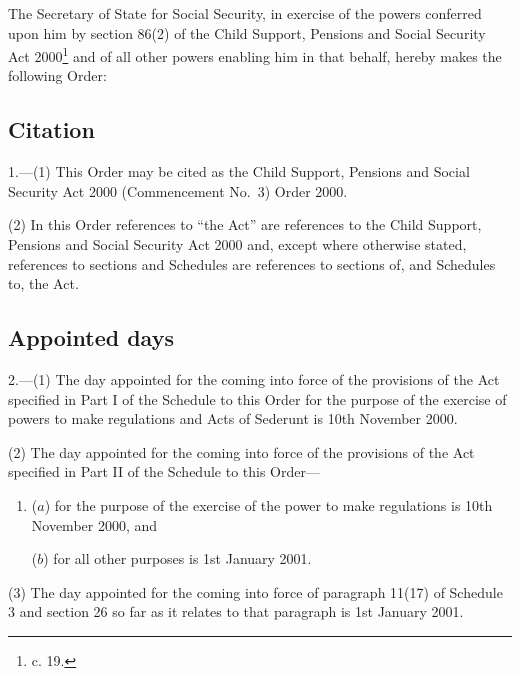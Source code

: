 \documentclass[12pt,a4paper]{article}
\title{\regstitle}
\author{S.I. 2000 No. 2994 (C.94)}
\date{Made 7th November 2000}
\begin{document}
\maketitle

\noindent
The Secretary of State for Social Security, in exercise of the powers conferred upon him by section 86(2) of the Child Support, Pensions and Social Security Act 2000\footnote{ c. 19.} and of all other powers enabling him in that behalf, hereby makes the following Order: 

{\sloppy

\tableofcontents

}

\bigskip

\setcounter{secnumdepth}{-2}

\subsection[1. Citation]{Citation}

1.---(1)  This Order may be cited as the Child Support, Pensions and Social Security Act 2000 (Commencement No.\ 3) Order 2000.

(2) In this Order references to “the Act” are references to the Child Support, Pensions and Social Security Act 2000 and, except where otherwise stated, references to sections and Schedules are references to sections of, and Schedules to, the Act.

\subsection[2. Appointed days]{Appointed days}

2.---(1)  The day appointed for the coming into force of the provisions of the Act specified in Part I of the Schedule to this Order for the purpose of the exercise of powers to make regulations and Acts of Sederunt is 10th November 2000.

(2) The day appointed for the coming into force of the provisions of the Act specified in Part II of the Schedule to this Order—
\begin{enumerate}\item[]
($a$) for the purpose of the exercise of the power to make regulations is 10th November 2000, and

($b$) for all other purposes is 1st January 2001.
\end{enumerate}

(3) The day appointed for the coming into force of paragraph 11(17) of Schedule 3 and section 26 so far as it relates to that paragraph is 1st January 2001.
\end{document}
